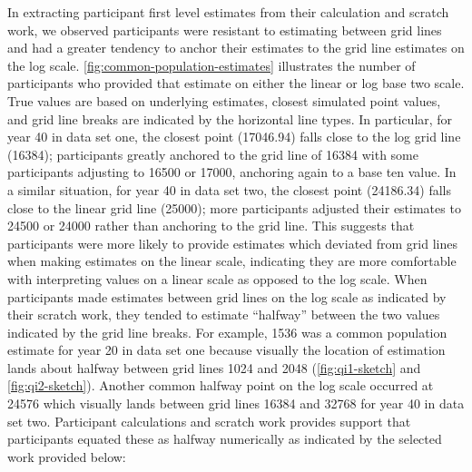 \documentclass[print]{nuthesis}
\begin{document}
In extracting participant first level estimates from their calculation and scratch work, we observed participants were resistant to estimating between grid lines and had a greater tendency to anchor their estimates to the grid line estimates on the log scale. 
\cref{fig:common-population-estimates} illustrates the number of participants who provided that estimate on either the linear or log base two scale.
True values are based on underlying estimates, closest simulated point values, and grid line breaks are indicated by the horizontal line types.
In particular, for year 40 in data set one, the closest point (17046.94) falls close to the log grid line (16384); participants greatly anchored to the grid line of 16384 with some participants adjusting to 16500 or 17000, anchoring again to a base ten value.
In a similar situation, for year 40 in data set two, the closest point (24186.34) falls close to the linear grid line (25000); more participants adjusted their estimates to 24500 or 24000 rather than anchoring to the grid line.
This suggests that participants were more likely to provide estimates which deviated from grid lines when making estimates on the linear scale, indicating they are more comfortable with interpreting values on a linear scale as opposed to the log scale.
When participants made estimates between grid lines on the log scale as indicated by their scratch work, they tended to estimate ``halfway'' between the two values indicated by the grid line breaks.
For example, 1536 was a common population estimate for year 20 in data set one because visually the location of estimation lands about halfway between grid lines 1024 and 2048 (\cref{fig:qi1-sketch} and \cref{fig:qi2-sketch}).
Another common halfway point on the log scale occurred at 24576 which visually lands between grid lines 16384 and 32768 for year 40 in data set two.
Participant calculations and scratch work provides support that participants equated these as halfway numerically as indicated by the selected work provided below:
\end{document}
